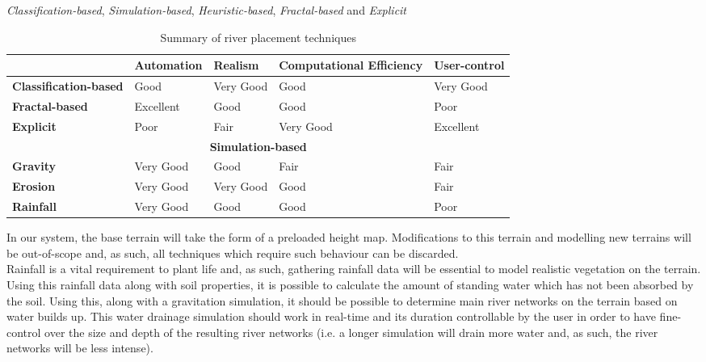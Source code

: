 \textit{Classification-based}, \textit{Simulation-based}, \textit{Heuristic-based}, \textit{Fractal-based} and \textit{Explicit}

\begin{table}[h]
  \centering
	    \begin{tabular}{|p{4cm}|p{3cm}|p{3cm}|p{3cm}|p{3cm}|}
  	    \hline	
  	      & \textbf{Automation} & \textbf{Realism} & \textbf{Computational Efficiency} & \textbf{User-control} \\
		\hline	
		\textbf{Classification-based} & 
		 Good  & Very Good  & Good & Very Good  \\
  	    \hline	
		\textbf{Fractal-based} & 
		 Excellent & Good & Good & Poor  \\
  	    \hline
		\textbf{Explicit} & 
		 Poor & Fair & Very Good & Excellent   \\
  	    \hline
  	    \multicolumn{5}{|c|}{\textbf{Simulation-based}} \\
  	    \hline				
  	    \textbf{Gravity} & 
		 Very Good & Good & Fair & Fair   \\
  	    \hline
		\textbf{Erosion} & 
		 Very Good & Very Good & Good & Fair      \\
  	    \hline
  	    	\textbf{Rainfall} & 
		 Very Good & Good & Good & Poor      \\
  	    \hline		
  	    \end{tabular}
  \caption[Summary of river placement techniques]{Summary of river placement techniques}
	\label{Pros and cons of individual techniques}
\end{table}

In our system, the base terrain will take the form of a preloaded height map. Modifications to this terrain and modelling new terrains will be out-of-scope and, as such, all techniques which require such behaviour can be discarded.\\
Rainfall is a vital requirement to plant life and, as such, gathering rainfall data will be essential to model realistic vegetation on the terrain. Using this rainfall data along with soil properties, it is possible to calculate the amount of standing water which has not been absorbed by the soil. Using this, along with a gravitation simulation, it should be possible to determine main river networks on the terrain based on water builds up. This water drainage simulation should work in real-time and its duration controllable by the user in order to have fine-control over the size and depth of the resulting river networks (i.e. a longer simulation will drain more water and, as such, the river networks will be less intense).

